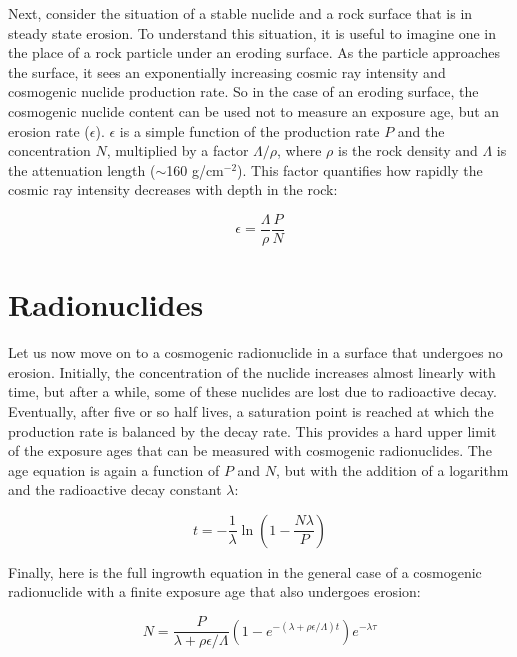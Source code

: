 \documentclass{book}
\begin{document}
Next, consider the situation of a stable nuclide and a rock surface
that is in steady state erosion. To understand this situation, it is
useful to imagine one in the place of a rock particle under an eroding
surface. As the particle approaches the surface, it sees an
exponentially increasing cosmic ray intensity and cosmogenic nuclide
production rate. So in the case of an eroding surface, the cosmogenic
nuclide content can be used not to measure an exposure age, but an
erosion rate ($\epsilon$). $\epsilon$ is a simple function of the
production rate $P$ and the concentration $N$, multiplied by a factor
$\Lambda/\rho$, where $\rho$ is the rock density and $\Lambda$ is the
attenuation length ($\sim$160 g/cm$^{-2}$).  This factor quantifies
how rapidly the cosmic ray intensity decreases with depth in the rock:

\begin{equation}
\epsilon = \frac{\Lambda}{\rho} \frac{P}{N}
\label{eq:cosmo-erosion}
\end{equation}

\section{Radionuclides}

Let us now move on to a cosmogenic radionuclide in a surface that
undergoes no erosion. Initially, the concentration of the nuclide
increases almost linearly with time, but after a while, some of these
nuclides are lost due to radioactive decay. Eventually, after five or
so half lives, a saturation point is reached at which the production
rate is balanced by the decay rate. This provides a hard upper limit
of the exposure ages that can be measured with cosmogenic
radionuclides. The age equation is again a function of $P$ and $N$,
but with the addition of a logarithm and the radioactive decay
constant $\lambda$:

\begin{equation}
t = -\frac{1}{\lambda} \ln\left(1-\frac{N\lambda}{P}\right)
\label{eq:cosmo-radioexposure}
\end{equation}

Finally, here is the full ingrowth equation in the general case of a
cosmogenic radionuclide with a finite exposure age that also undergoes
erosion:

\begin{equation}
N = \frac{P}{\lambda + \rho\epsilon/\Lambda}
\left(1-e^{-(\lambda+\rho\epsilon/\Lambda)t}\right) e^{-\lambda\tau}
\label{eq:cosmo-N}
\end{equation}
\end{document}
